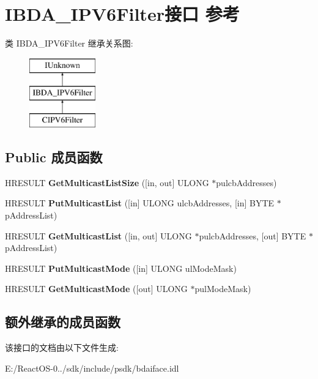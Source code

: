 \hypertarget{interface_i_b_d_a___i_p_v6_filter}{}\section{I\+B\+D\+A\+\_\+\+I\+P\+V6\+Filter接口 参考}
\label{interface_i_b_d_a___i_p_v6_filter}
类 I\+B\+D\+A\+\_\+\+I\+P\+V6\+Filter 继承关系图\+:\begin{figure}[H]
\begin{center}
\leavevmode
\includegraphics[height=3.000000cm]{interface_i_b_d_a___i_p_v6_filter}
\end{center}
\end{figure}
\subsection*{Public 成员函数}
\begin{DoxyCompactItemize}
\item 
\mbox{\label{interface_i_b_d_a___i_p_v6_filter_a988b3b54c4e3177e3b4c611235822ee1}} 
H\+R\+E\+S\+U\+LT {\bfseries Get\+Multicast\+List\+Size} (\mbox{[}in, out\mbox{]} U\+L\+O\+NG $\ast$pulcb\+Addresses)
\item 
\mbox{\label{interface_i_b_d_a___i_p_v6_filter_aaed5c992d97825f03289d5fec3ae9714}} 
H\+R\+E\+S\+U\+LT {\bfseries Put\+Multicast\+List} (\mbox{[}in\mbox{]} U\+L\+O\+NG ulcb\+Addresses, \mbox{[}in\mbox{]} B\+Y\+TE $\ast$p\+Address\+List)
\item 
\mbox{\label{interface_i_b_d_a___i_p_v6_filter_a76a2043ca418907ef77d63ce02b80201}} 
H\+R\+E\+S\+U\+LT {\bfseries Get\+Multicast\+List} (\mbox{[}in, out\mbox{]} U\+L\+O\+NG $\ast$pulcb\+Addresses, \mbox{[}out\mbox{]} B\+Y\+TE $\ast$p\+Address\+List)
\item 
\mbox{\label{interface_i_b_d_a___i_p_v6_filter_aaf5c34c68fa2adfb5282eec300a4b853}} 
H\+R\+E\+S\+U\+LT {\bfseries Put\+Multicast\+Mode} (\mbox{[}in\mbox{]} U\+L\+O\+NG ul\+Mode\+Mask)
\item 
\mbox{\label{interface_i_b_d_a___i_p_v6_filter_aed73381e1d24e81177db93ad21ded636}} 
H\+R\+E\+S\+U\+LT {\bfseries Get\+Multicast\+Mode} (\mbox{[}out\mbox{]} U\+L\+O\+NG $\ast$pul\+Mode\+Mask)
\end{DoxyCompactItemize}
\subsection*{额外继承的成员函数}


该接口的文档由以下文件生成\+:\begin{DoxyCompactItemize}
\item 
E\+:/\+React\+O\+S-\/0../sdk/include/psdk/bdaiface.\+idl\end{DoxyCompactItemize}

